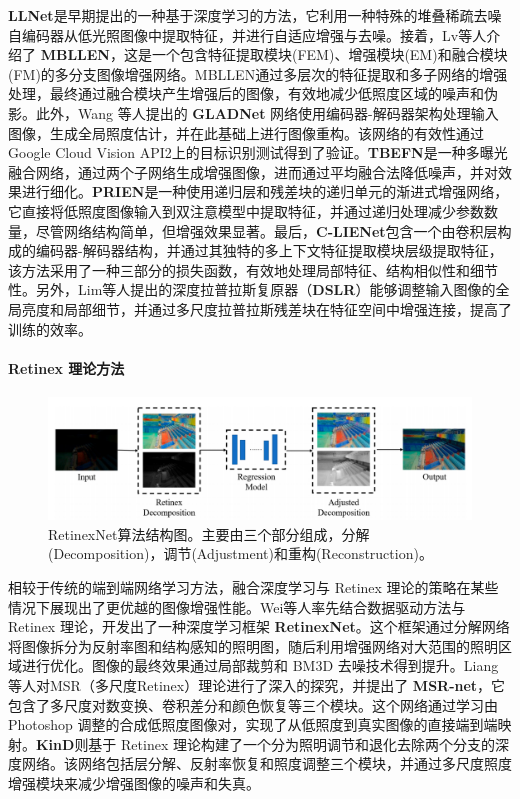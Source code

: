 \documentclass[a4paper, 10pt]{article}
\begin{document}
	\textbf{LLNet}\cite{lore2017llnet}是早期提出的一种基于深度学习的方法，它利用一种特殊的堆叠稀疏去噪自编码器从低光照图像中提取特征，并进行自适应增强与去噪。接着，Lv等人\cite{lv2018mbllen}介绍了 \textbf{MBLLEN}，这是一个包含特征提取模块(FEM)、增强模块(EM)和融合模块(FM)的多分支图像增强网络。MBLLEN通过多层次的特征提取和多子网络的增强处理，最终通过融合模块产生增强后的图像，有效地减少低照度区域的噪声和伪影。此外，Wang 等人\cite{wang2018gladnet}提出的 \textbf{GLADNet} 网络使用编码器-解码器架构处理输入图像，生成全局照度估计，并在此基础上进行图像重构。该网络的有效性通过Google Cloud Vision API2上的目标识别测试得到了验证。\textbf{TBEFN}\cite{lu2020tbefn}是一种多曝光融合网络，通过两个子网络生成增强图像，进而通过平均融合法降低噪声，并对效果进行细化。\textbf{PRIEN}\cite{li2021low}是一种使用递归层和残差块的递归单元的渐进式增强网络，它直接将低照度图像输入到双注意模型中提取特征，并通过递归处理减少参数数量，尽管网络结构简单，但增强效果显著。最后，\textbf{C-LIENet}\cite{ravirathinam2021c}包含一个由卷积层构成的编码器-解码器结构，并通过其独特的多上下文特征提取模块层级提取特征，该方法采用了一种三部分的损失函数，有效地处理局部特征、结构相似性和细节性。另外，Lim等人\cite{lim2020dslr}提出的深度拉普拉斯复原器（\textbf{DSLR}）能够调整输入图像的全局亮度和局部细节，并通过多尺度拉普拉斯残差块在特征空间中增强连接，提高了训练的效率。
	
	\paragraph{Retinex 理论方法}
	
	\begin{figure}[htb]
		\centering 
		\includegraphics[width=\columnwidth]{picture/LLIE/RetinexNet/RetinexNet}
		\caption{
			\label{fig: RetinexNet} 
			RetinexNet算法结构图。主要由三个部分组成，分解(Decomposition)，调节(Adjustment)和重构(Reconstruction)。
		}
	\end{figure}
	
	相较于传统的端到端网络学习方法，融合深度学习与 Retinex 理论的策略在某些情况下展现出了更优越的图像增强性能。Wei等人\cite{wei2018deep}率先结合数据驱动方法与 Retinex 理论，开发出了一种深度学习框架 \textbf{RetinexNet}。这个框架通过分解网络将图像拆分为反射率图和结构感知的照明图，随后利用增强网络对大范围的照明区域进行优化。图像的最终效果通过局部裁剪和 BM3D 去噪技术得到提升。Liang等人\cite{shen2017msr}对MSR（多尺度Retinex）理论进行了深入的探究，并提出了 \textbf{MSR-net}，它包含了多尺度对数变换、卷积差分和颜色恢复等三个模块。这个网络通过学习由 Photoshop 调整的合成低照度图像对，实现了从低照度到真实图像的直接端到端映射。\textbf{KinD}\cite{zhang2019kindling}则基于 Retinex 理论构建了一个分为照明调节和退化去除两个分支的深度网络。该网络包括层分解、反射率恢复和照度调整三个模块，并通过多尺度照度增强模块来减少增强图像的噪声和失真。
	
\end{document}
